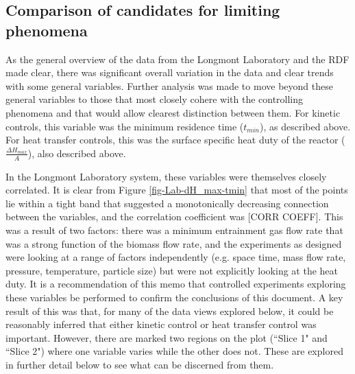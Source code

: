 \documentclass[11pt,twocolumn]{article}
\begin{document}
\subsection*{Comparison of candidates for limiting phenomena}

As the general overview of the data from the Longmont Laboratory and the RDF made clear, there was significant overall variation in the data and clear trends with some general variables.  Further analysis was made to move beyond these general variables to those that most closely cohere with the controlling phenomena and that would allow clearest distinction between them.  For kinetic controls, this variable was the minimum residence time ($t_{min}$), as described above.  For heat transfer controls, this was the surface specific heat duty of the reactor ($\frac{\Delta H_{max}}{A}$), also described above.  

In the Longmont Laboratory system, these variables were themselves closely correlated. It is clear from Figure \ref{fig-Lab-dH_max-tmin} that most of the points lie within a tight band that suggested a monotonically decreasing connection between the variables, and the correlation coefficient was [CORR COEFF].  This was a result of two factors: there was a minimum entrainment gas flow rate that was a strong function of the biomass flow rate, and the experiments as designed were looking at a range of factors independently (e.g. space time, mass flow rate, pressure, temperature, particle size) but were not explicitly looking at the heat duty.  It is a recommendation of this memo that controlled experiments exploring these variables be performed to confirm the conclusions of this document.  A key result of this was that, for many of the data views explored below, it could be reasonably inferred that either kinetic control or heat transfer control was important.  However, there are marked two regions on the plot (``Slice 1" and ``Slice 2") where one variable varies while the other does not.  These are explored in further detail below to see what can be discerned from them.
\end{document}
